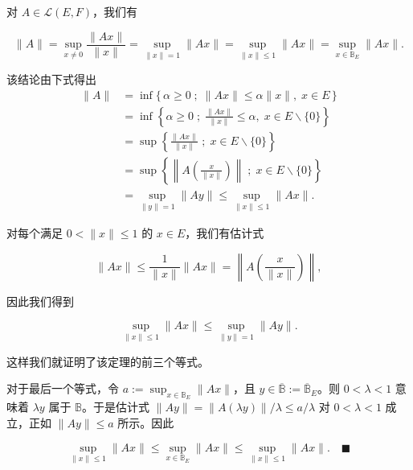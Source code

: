 \begin{proposition}

对 $ A \in \mathcal{L}(E, F) $，我们有

\[
\|A\| = \sup_{x \ne 0} \frac{\|Ax\|}{\|x\|} = \sup_{\|x\| = 1} \|Ax\| = \sup_{\|x\| \le 1} \|Ax\| = \sup_{x \in \mathbb{B}_E} \|Ax\|.
\]

\proofhead
该结论由下式得出
\begin{equation*}
\begin{aligned}
\|A\| &= \inf\{\, \alpha \ge 0 \;;\; \|Ax\| \le \alpha \|x\|, \; x \in E \,\} \\ &= \inf\left\{ \alpha \ge 0 \;;\; \frac{\|Ax\|}{\|x\|} \le \alpha, \; x \in E \backslash \{0\} \right\} \\ &= \sup\left\{ \frac{\|Ax\|}{\|x\|} \;;\; x \in E \backslash \{0\} \right\} \\ &= \sup\left\{ \left\| A\left( \frac{x}{\|x\|} \right) \right\| \;;\; x \in E \backslash \{0\} \right\} \\ &= \sup_{\|y\| = 1} \|Ay\| \le \sup_{\|x\| \le 1} \|Ax\|.
\end{aligned}
\end{equation*}

对每个满足 $ 0 < \|x\| \le 1 $ 的 $ x \in E $，我们有估计式

\[
\|Ax\| \le \frac{1}{\|x\|} \|Ax\| = \left\| A\left( \frac{x}{\|x\|} \right) \right\|,
\]

因此我们得到

\[
\sup_{\|x\| \le 1} \|Ax\| \le \sup_{\|y\| = 1} \|Ay\|.
\]

这样我们就证明了该定理的前三个等式。

对于最后一个等式，令 $ a := \sup_{x \in \mathbb{B}_E} \|Ax\| $，且 $ y \in \overline{\mathbb{B}} := \overline{\mathbb{B}}_E $。则 $ 0 < \lambda < 1 $ 意味着 $ \lambda y $ 属于 $ \mathbb{B} $。于是估计式 $ \|Ay\| = \|A(\lambda y)\|/\lambda \le a/\lambda $ 对 $ 0 < \lambda < 1 $ 成立，正如 $ \|Ay\| \le a $ 所示。因此

\[
\sup_{\|x\| \le 1} \|Ax\| \le \sup_{x \in \mathbb{B}_E} \|Ax\| \le \sup_{\|x\| \le 1} \|Ax\|.\quad\blacksquare
\]
\end{proposition}

